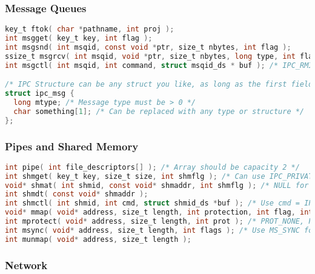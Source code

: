 \documentclass[legalpaper,10pt]{article}
\begin{document}
\subsubsection*{Message Queues}
\begin{lstlisting}[language=C]
key_t ftok( char *pathname, int proj );
int msgget( key_t key, int flag ); 
int msgsnd( int msqid, const void *ptr, size_t nbytes, int flag );
ssize_t msgrcv( int msqid, void *ptr, size_t nbytes, long type, int flag );
int msgctl( int msqid, int command, struct msqid_ds * buf ); /* IPC_RMID for command, NULL for buf */

/* IPC Structure can be any struct you like, as long as the first field is long */
struct ipc_msg {
  long mtype; /* Message type must be > 0 */
  char something[1]; /* Can be replaced with any type or structure */
};

\end{lstlisting}

\subsubsection*{Pipes and Shared Memory}

\begin{lstlisting}[language=C]
int pipe( int file_descriptors[] ); /* Array should be capacity 2 */
int shmget( key_t key, size_t size, int shmflg ); /* Can use IPC_PRIVATE for key, shmflag = UNIX permissions, can combine with IPC_CREAT and/or IPC_EXCL */
void* shmat( int shmid, const void* shmaddr, int shmflg ); /* NULL for shmaddr and 0 for shmflg for defaults */ 
int shmdt( const void* shmaddr );
int shmctl( int shmid, int cmd, struct shmid_ds *buf ); /* Use cmd = IPC_RMID and buf = NULL to delete */
void* mmap( void* address, size_t length, int protection, int flag, int fd, off_t offset ); /* address = NULL */
int mprotect( void* address, size_t length, int prot ); /* PROT_NONE, PROT_READ, PROT_WRITE, PROT_EXECUTE */
int msync( void* address, size_t length, int flags ); /* Use MS_SYNC for flags */
int munmap( void* address, size_t length );
\end{lstlisting}


\subsubsection*{Network}
\end{document}
